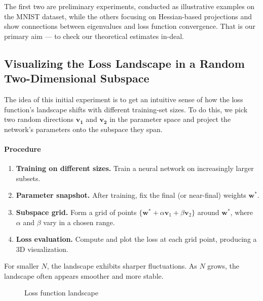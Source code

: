 \documentclass{article}
\begin{document}
The first two are preliminary experiments, conducted as illustrative examples on the MNIST dataset,
while the others focusing on Hessian-based projections and show connections between eigenvalues and loss function convergence.
That is our primary aim --- to check our theoretical estimates in-deal.


\subsection{Visualizing the Loss Landscape in a Random Two-Dimensional Subspace}
The idea of this initial experiment is to get an intuitive sense of how the loss function’s landscape shifts with
different training-set sizes. To do this, we pick two random directions $\mathbf{v_1}$ and $\mathbf{v_2}$ in the parameter
space and project the network’s parameters onto the subspace they span.


\paragraph{Procedure}
\begin{enumerate}
  \item \textbf{Training on different sizes.} Train a neural network on increasingly larger subsets.
  \item \textbf{Parameter snapshot.} After training, fix the final (or near-final) weights $\mathbf{w}^*$.
  \item \textbf{Subspace grid.} Form a grid of points $\{\mathbf{w}^* + \alpha \mathbf{v}_1 + \beta \mathbf{v}_2\}$ around $\mathbf{w}^*$, where $\alpha$ and $\beta$ vary in a chosen range.
  \item \textbf{Loss evaluation.} Compute and plot the loss at each grid point, producing a 3D visualization.
\end{enumerate}

For smaller $N$, the landscape exhibits sharper fluctuations. As $N$ grows, the landscape often appears smoother and more stable.

\begin{figure}[!htbp]
  \hspace*{-11.5cm}
  \caption{Loss function landscape}
  \label{fig:base_loss}
\end{figure}
\end{document}
